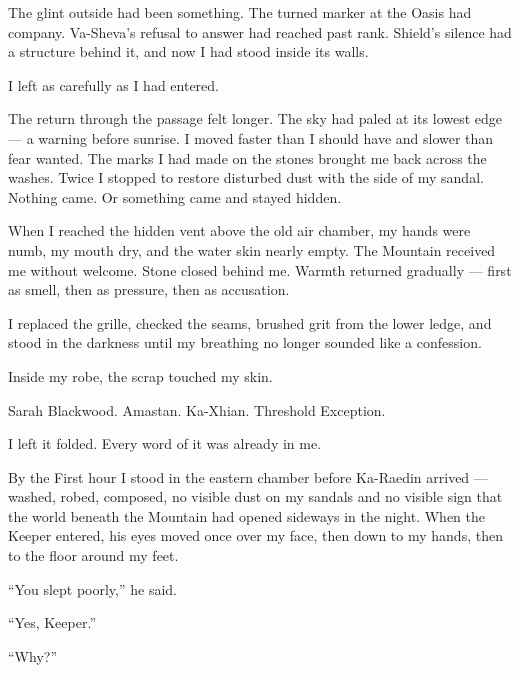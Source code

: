 The glint outside had been something. The turned marker at the Oasis had company. Va-Sheva's refusal to answer had reached past rank. Shield's silence had a structure behind it, and now I had stood inside its walls.\par

I left as carefully as I had entered.\par

The return through the passage felt longer. The sky had paled at its lowest edge --- a warning before sunrise. I moved faster than I should have and slower than fear wanted. The marks I had made on the stones brought me back across the washes. Twice I stopped to restore disturbed dust with the side of my sandal. Nothing came. Or something came and stayed hidden.\par

When I reached the hidden vent above the old air chamber, my hands were numb, my mouth dry, and the water skin nearly empty. The Mountain received me without welcome. Stone closed behind me. Warmth returned gradually --- first as smell, then as pressure, then as accusation.\par

I replaced the grille, checked the seams, brushed grit from the lower ledge, and stood in the darkness until my breathing no longer sounded like a confession.\par

Inside my robe, the scrap touched my skin.\par

Sarah Blackwood. Amastan. Ka-Xhian. Threshold Exception.\par

I left it folded. Every word of it was already in me.\par

By the First hour I stood in the eastern chamber before Ka-Raedin arrived --- washed, robed, composed, no visible dust on my sandals and no visible sign that the world beneath the Mountain had opened sideways in the night. When the Keeper entered, his eyes moved once over my face, then down to my hands, then to the floor around my feet.\par

``You slept poorly,'' he said.\par

``Yes, Keeper.''\par

``Why?''\par

